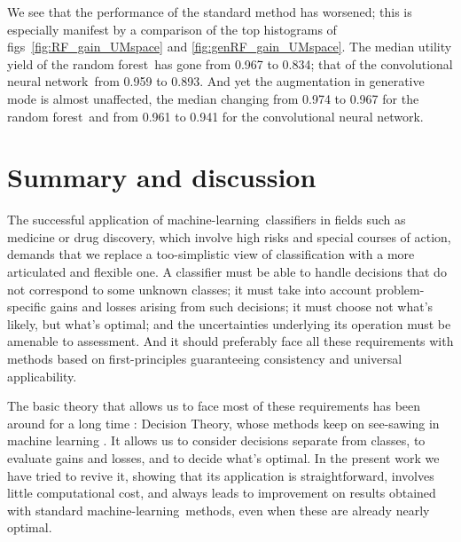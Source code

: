\documentclass[\ifafour a4paper,12pt,\else a5paper,10pt,\fi%
onecolumn,oneside,article,%
british%
]{memoir}
\theoremstyle{remark}
\theoremstyle{innote}
\newcommand*{\puzzle}{{\fontencoding{U}\fontfamily{fontawesometwo}\selectfont\symbol{225}}}
\newcommand{\mynotez}[1]{{\footnotesize\color{notecolour}\puzzle\ #1}}
\newcommand*{\p}{\mathrm{p}}%
\renewcommand*{\|}[1][]{\nonscript\:#1\vert\nonscript\:\mathopen{}}
\newcommand*{\sect}{\S}%
\newcommand*{\figs}{figs}%
\newcommand*{\eg}{{e.g.}}
\newcommand*{\cf}{{cf.}}
\newcommand*{\ml}{machine-learning}
\newcommand*{\RF}{random forest}
\newcommand*{\CNN}{convolutional neural network}
\begin{document}
We see that the performance of the standard method has worsened; this is especially manifest by a comparison of the top histograms of \figs~\ref{fig:RF_gain_UMspace} and \ref{fig:genRF_gain_UMspace}. The median utility yield of the \RF\ has gone from 0.967 to 0.834; that of the \CNN\ from 0.959 to 0.893. And yet the augmentation in generative mode is almost unaffected, the median changing from 0.974 to 0.967 for the \RF\ and from 0.961 to 0.941 for the \CNN.




\section{Summary and discussion}
\label{sec:summary_discussion}

The successful application of \ml\ classifiers in fields such as medicine or drug discovery, which involve high risks and special courses of action, demands that we replace a too-simplistic view of classification with a more articulated and flexible one. A classifier must be able to handle decisions that do not correspond to some unknown classes; it must take into account problem-specific gains and losses arising from such decisions; it must choose not what's likely, but what's optimal; and the uncertainties underlying its operation must be amenable to assessment. And it should preferably face all these requirements with methods based on first-principles guaranteeing consistency and universal applicability.

The basic theory that allows us to face most of these requirements has been around for a long time \autocites[at least since][]{luceetal1957}[\cf][\sect~1.2]{russelletal1995_r2022}: Decision Theory, whose methods keep on see-sawing in machine learning \autocites[\eg][]{selfetal1987,elkan2001,drummondetal2005}. It allows us to consider decisions separate from classes, to evaluate gains and losses, and to decide what's optimal. In the present work we have tried to revive it, showing that its application is straightforward, involves little computational cost, and always leads to improvement on results obtained with standard \ml\ methods, even when these are already nearly optimal.
\end{document}
